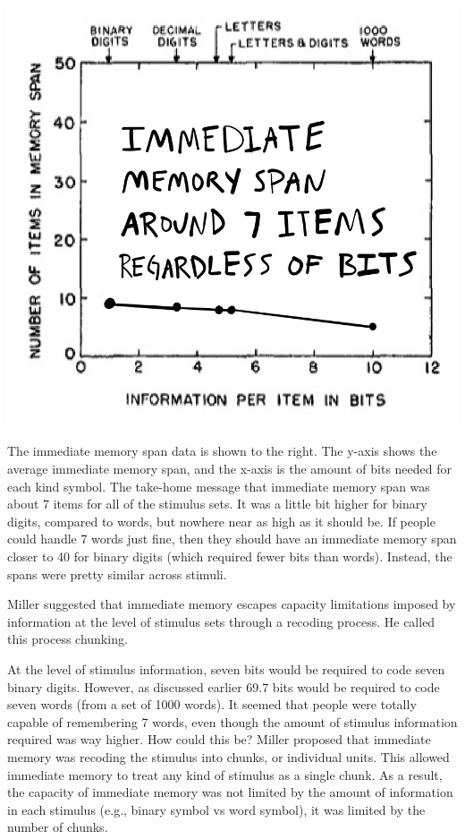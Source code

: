 \documentclass[
  oneside,
  12pt]{crumpbook}
\newenvironment{floatright50}{%
  \wrapfigure{R}{.5\textwidth}%
  }{%
  \endwrapfigure}
\begin{document}
\begin{floatright50}
\includegraphics[width=1\linewidth]{imgs/Miller_im_span}

\end{floatright50}

The immediate memory span data is shown to the right. The y-axis shows the average immediate memory span, and the x-axis is the amount of bits needed for each kind symbol. The take-home message that immediate memory span was about 7 items for all of the stimulus sets. It was a little bit higher for binary digits, compared to words, but nowhere near as high as it should be. If people could handle 7 words just fine, then they should have an immediate memory span closer to 40 for binary digits (which required fewer bits than words). Instead, the spans were pretty similar across stimuli.

Miller suggested that immediate memory escapes capacity limitations imposed by information at the level of stimulus sets through a recoding process. He called this process chunking.

At the level of stimulus information, seven bits would be required to code seven binary digits. However, as discussed earlier 69.7 bits would be required to code seven words (from a set of 1000 words). It seemed that people were totally capable of remembering 7 words, even though the amount of stimulus information required was way higher. How could this be? Miller proposed that immediate memory was recoding the stimulus into chunks, or individual units. This allowed immediate memory to treat any kind of stimulus as a single chunk. As a result, the capacity of immediate memory was not limited by the amount of information in each stimulus (e.g., binary symbol vs word symbol), it was limited by the number of chunks.
\end{document}
